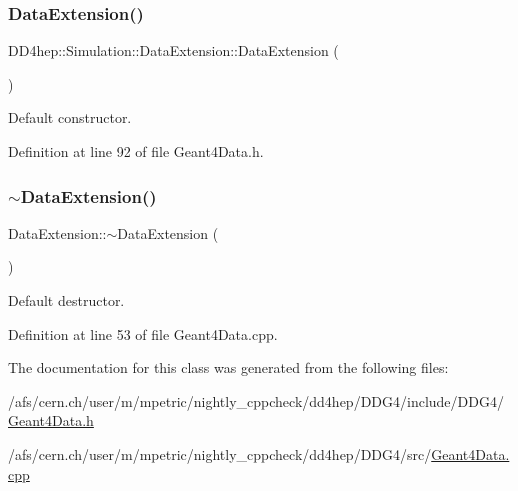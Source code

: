 \subsubsection{\texorpdfstring{Data\+Extension()}{DataExtension()}}
{\footnotesize\ttfamily D\+D4hep\+::\+Simulation\+::\+Data\+Extension\+::\+Data\+Extension (\begin{DoxyParamCaption}{ }\end{DoxyParamCaption})\hspace{0.3cm}{\ttfamily [inline]}}



Default constructor. 



Definition at line 92 of file Geant4\+Data.\+h.

\hypertarget{class_d_d4hep_1_1_simulation_1_1_data_extension_a088b1be47c96c8b6ab44527bfa1f60bc}{}\label{class_d_d4hep_1_1_simulation_1_1_data_extension_a088b1be47c96c8b6ab44527bfa1f60bc} 
\subsubsection{\texorpdfstring{$\sim$\+Data\+Extension()}{~DataExtension()}}
{\footnotesize\ttfamily Data\+Extension\+::$\sim$\+Data\+Extension (\begin{DoxyParamCaption}{ }\end{DoxyParamCaption})\hspace{0.3cm}{\ttfamily [virtual]}}



Default destructor. 



Definition at line 53 of file Geant4\+Data.\+cpp.



The documentation for this class was generated from the following files\+:\begin{DoxyCompactItemize}
\item 
/afs/cern.\+ch/user/m/mpetric/nightly\+\_\+cppcheck/dd4hep/\+D\+D\+G4/include/\+D\+D\+G4/\hyperlink{_geant4_data_8h}{Geant4\+Data.\+h}\item 
/afs/cern.\+ch/user/m/mpetric/nightly\+\_\+cppcheck/dd4hep/\+D\+D\+G4/src/\hyperlink{_geant4_data_8cpp}{Geant4\+Data.\+cpp}\end{DoxyCompactItemize}
